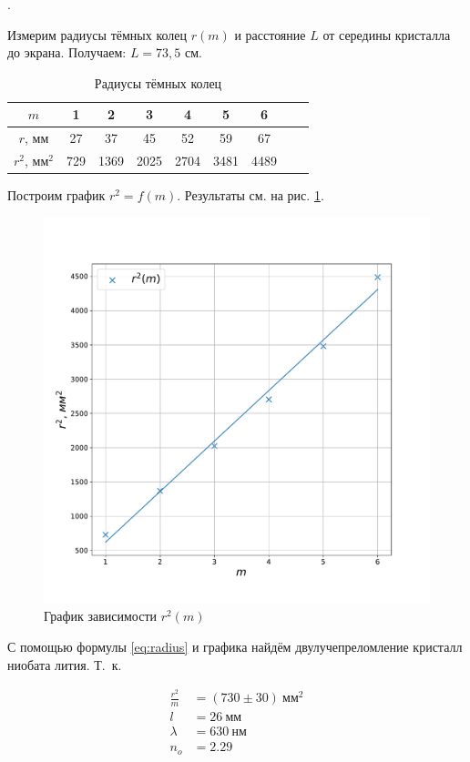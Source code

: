 \documentclass[a4paper, 12pt]{article}
\newcounter{Points}
\newcommand{\point}{\arabic{Points}. \addtocounter{Points}{1}}
\begin{document}
\point Измерим радиусы тёмных колец $r(m)$ и расстояние $L$ от середины кристалла до экрана. Получаем: $L = 73,5$ см. 

\begin{table}[!h]
    \centering
    \begin{tabular}{|c|c|c|c|c|c|c|c|c|}
        \hline
        $m$ & 1 & 2 & 3 & 4 & 5 & 6\\ \hline
        $r$, мм & 27 & 37 & 45 & 52 & 59 & 67\\ \hline
        $r^2$, $мм^2$ & 729 & 1369 & 2025 & 2704 & 3481 & 4489 \\ \hline
    \end{tabular}
    \caption {Радиусы тёмных колец}
    \label{table:light}
\end{table}

Построим график $r^2 = f(m)$. Результаты см. на рис. \ref{img:graph}.

\begin{figure}[!b]
    \includegraphics[scale = 0.5]{graph}
    \centering
    \caption{График зависимости $r^2 (m)$}
    \label{img:graph}
\end{figure}

С помощью формулы \eqref{eq:radius} и графика найдём двулучепреломление кристалл ниобата лития. Т.~к. 

\begin{align*}
    \frac{r^2}{m} &= (730 \pm 30) ~мм^2 \\
    l &= 26~мм \\
    \lambda &= 630~нм \\
    n_o &= 2.29
\end{align*}
\end{document}
